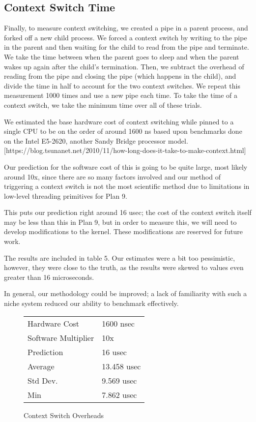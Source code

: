 \documentclass[letterpaper,twocolumn,10pt]{article}
\begin{document}
\subsection{Context Switch Time}

Finally, to measure context switching, we created a pipe in a parent process,
and forked off a new child process. We forced a context switch by writing to
the pipe in the parent and then waiting for the child to read from the pipe
and terminate. We take the time between when the parent goes to sleep and when
the parent wakes up again after the child's termination. Then, we subtract
the overhead of reading from the pipe and closing the pipe (which happens in
the child), and divide the time in half to account for the two context switches.
We repeat this measurement 1000 times and use a new pipe each time. To take
the time of a context switch, we take the minimum time over all of these trials.

We estimated the base hardware cost of context switching while pinned to a single CPU to
be on the order of around 1600 ns based upon benchmarks done on the Intel E5-2620, another
Sandy Bridge processor model. [https://blog.tsunanet.net/2010/11/how-long-does-it-take-to-make-context.html]

Our prediction for the software cost of this is going to be quite large, most likely around 10x, since there
are so many factors involved and our method of triggering a context switch is not the most scientific 
method due to limitations in low-level threading primitives for Plan 9. 

This puts our prediction right around 16 usec; the cost of the context switch itself may be less than 
this in Plan 9, but in order to measure this, we will need to develop modifications to the kernel. 
These modifications are reserved for future work.

The results are included in table 5. Our estimates were a bit too pessimistic, however, they were close 
to the truth, as the results were skewed to values even greater than 16 microseconds. 

In general, our methodology could be improved; a lack of familiarity with such a niche system reduced our ability to benchmark effectively. 

\begin{figure}
	\centering
\begin{tabular}{ll}
Hardware Cost  & 1600 nsec  \\
Software Multiplier  & 10x   \\
Prediction  & 16 usec    \\
Average  & 13.458 usec    \\
Std Dev. & 9.569 usec     \\
Min      & 7.862 usec   
\end{tabular}
\caption{Context Switch Overheads}
\label{tab:conswitchoverheads}
\end{figure}
\end{document}
